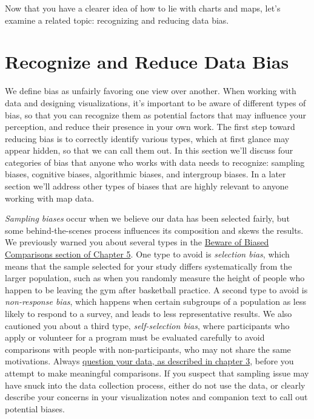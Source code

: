 \documentclass[
  english,
]{book}
\begin{document}
Now that you have a clearer idea of how to lie with charts and maps, let's examine a related topic: recognizing and reducing data bias.

\hypertarget{data-bias}{%
\section*{Recognize and Reduce Data Bias}\label{data-bias}}

We define bias as unfairly favoring one view over another. When working with data and designing visualizations, it's important to be aware of different types of bias, so that you can recognize them as potential factors that may influence your perception, and reduce their presence in your own work. The first step toward reducing bias is to correctly identify various types, which at first glance may appear hidden, so that we can call them out. In this section we'll discuss four categories of bias that anyone who works with data needs to recognize: sampling biases, cognitive biases, algorithmic biases, and intergroup biases. In a later section we'll address other types of biases that are highly relevant to anyone working with map data.

\emph{Sampling biases} occur when we believe our data has been selected fairly, but some behind-the-scenes process influences its composition and skews the results. We previously warned you about several types in the \href{biased-comparisons.html}{Beware of Biased Comparisons section of Chapter 5}. One type to avoid is \emph{selection bias}, which means that the sample selected for your study differs systematically from the larger population, such as when you randomly measure the height of people who happen to be leaving the gym after basketball practice. A second type to avoid is \emph{non-response bias}, which happens when certain subgroups of a population as less likely to respond to a survey, and leads to less representative results. We also cautioned you about a third type, \emph{self-selection bias}, where participants who apply or volunteer for a program must be evaluated carefully to avoid comparisons with people with non-participants, who may not share the same motivations. Always \href{question.html}{question your data, as described in chapter 3}, before you attempt to make meaningful comparisons. If you suspect that sampling issue may have snuck into the data collection process, either do not use the data, or clearly describe your concerns in your visualization notes and companion text to call out potential biases.
\end{document}
